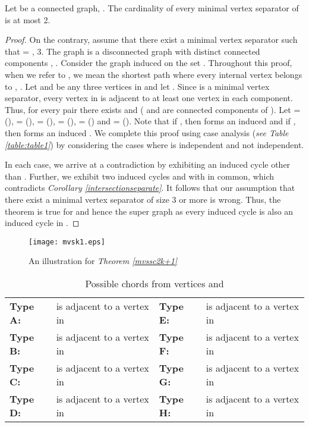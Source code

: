 \documentclass[runningheads]{llncs}
\begin{document}
\begin{theorem}
\label{mvssc2k+1}
 Let  be a connected  graph, . The cardinality of every minimal vertex separator of  is at most 2.
\end{theorem}
\begin{proof} On the contrary, assume that there exist a minimal vertex separator  such that  = ,  3. The graph  is a disconnected graph with distinct connected components , . 
Consider the graph  induced on the set . Throughout this proof, when we refer to , we mean the shortest path  where every internal vertex belongs to , . Let  and  be any three vertices in  and let . Since  is a minimal vertex separator, every vertex in  is adjacent to at least one vertex in each component. Thus, for every pair  there exists  and  ( and  are connected components of ). Let  = (),  = (),  = (),  = (),  = () and  = (). Note that if , then  forms an induced  and if , then  forms an induced . We complete this proof using case analysis (\emph{see Table \ref{table:table1}}) by considering the cases where  is independent and not independent.

In each case, we arrive at a contradiction by exhibiting an induced cycle other than . Further, we exhibit two induced cycles  and  with  in common, which contradicts \emph{Corollary \ref{intersectionseparate}}. It follows that our assumption that there exist a minimal vertex separator of size 3 or more is wrong. Thus, the theorem is true for  and hence the super graph  as every induced cycle  is also an induced cycle in . 
\end{proof}

\begin{figure}[h]
\vspace{-0.5cm}
\begin{center}
\texttt{[image: mvsk1.eps]}
\vspace{-0.5cm}
\caption{An illustration for \emph{Theorem \ref{mvssc2k+1}}}
\label{mvsk1}
\end{center}

\end{figure}

\vspace{-1.4cm}
\begin{table}[h]
\centering
\label{pre}
\caption{Possible chords from vertices  and }
\begin{tabular}{|l|l|l|l|} \hline
\textbf{Type A:} &  is adjacent to a vertex in  &
\textbf{Type E:} &  is adjacent to a vertex in  \\
\textbf{Type B:} &  is adjacent to a vertex in  &
\textbf{Type F:} &  is adjacent to a vertex in  \\
\textbf{Type C:} &  is adjacent to a vertex in  &
\textbf{Type G:} &  is adjacent to a vertex in  \\
\textbf{Type D:} &  is adjacent to a vertex in  &
\textbf{Type H:} &  is adjacent to a vertex in  \\ \hline
\end{tabular}
\vspace{-0.8cm}
\end{table}
\end{document}
